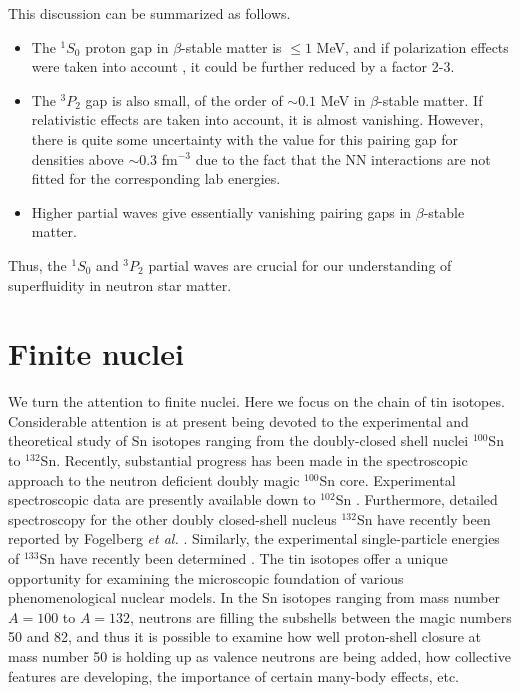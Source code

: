 \documentclass{ws-p9-75x6-50}
\begin{document}
This discussion  can be summarized as follows.
\begin{itemize}
      \item The $^1S_0$ proton gap in $\beta$-stable matter
            is $ \le 1$ MeV, and if polarization
            effects were taken into account \cite{sclbl96},
            it could be further reduced by a factor 2-3.
      \item The $^3P_2$ gap is also small, of the order
            of $\sim 0.1$ MeV in $\beta$-stable matter.
            If relativistic effects are taken into account,
            it is almost vanishing. However, there is
            quite some uncertainty with the value for this
            pairing gap for densities above $\sim 0.3$
            fm$^{-3}$ due to the fact that the NN interactions
            are not fitted for the corresponding lab energies. 
      \item Higher partial waves give essentially vanishing
            pairing gaps in $\beta$-stable matter.
\end{itemize}
Thus, the $^1S_0$ and $^3P_2$ partial waves are crucial for our
understanding of superfluidity in neutron star matter. 




\section{Finite nuclei} \label{sec:sec3}

We turn the attention to finite nuclei. Here we focus on the chain of 
tin isotopes. 
Considerable attention is at present being devoted to the
experimental and theoretical 
study of Sn isotopes \cite{schneider94,grawe95,fog94,hoff96,ehho95,ehho97}
ranging from the doubly-closed shell nuclei $^{100}$Sn to 
$^{132}$Sn.
Recently, substantial progress has been made in the 
spectroscopic approach to the neutron deficient doubly 
magic $^{100}$Sn core. Experimental
spectroscopic data are presently available down to $^{102}$Sn
\cite{grawe95}. 
Furthermore, detailed
spectroscopy for the other doubly closed-shell nucleus $^{132}$Sn
have recently been reported by Fogelberg {\em et al.}
\cite{fog94}. Similarly, the experimental single-particle
energies of $^{133}$Sn have recently been determined \cite{hoff96}.
The tin isotopes offer a unique opportunity for examining the
microscopic foundation of various phenomenological nuclear
models. In the Sn isotopes ranging from mass number $A=100$ to
$A=132$, neutrons are filling the subshells between the magic
numbers 50 and 82, and thus it is possible to examine how well
proton-shell closure at mass number 50 is holding up as valence
neutrons are being added, how collective features are developing,
the importance of certain many-body effects, etc.
\end{document}
